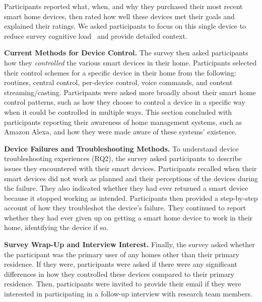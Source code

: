 Participants reported what, when, and why they purchased their most recent smart home devices, then rated how well these devices met their goals and explained their ratings. We asked participants to focus on this single device to reduce survey cognitive load~\cite{lenzner2010cognitive} and provide detailed context. 

\noindent\textbf{Current Methods for Device Control.}
\label{cic:survey:control}
The survey then asked participants how they \textit{controlled} the various smart devices in their home. Participants selected their control schemes for a specific device in their home from the following: routines, central control, per-device control, voice commands, and content streaming/casting. Participants were asked more broadly about their smart home control patterns, such as how they choose to control a device in a specific way when it could be controlled in multiple ways. This section concluded with participants reporting their awareness of home management systems, such as Amazon Alexa, and how they were made aware of these systems' existence. 

\noindent\textbf{Device Failures and Troubleshooting Methods.}
To understand device troubleshooting experiences (RQ2), the survey asked participants to describe issues they encountered with their smart devices. Participants recalled when their smart devices did not work as planned and their perceptions of the devices during the failure. They also indicated whether they had ever returned a smart device because it stopped working as intended. Participants then provided a step-by-step account of how they troubleshot the device's failure. They continued to report whether they had ever given up on getting a smart home device to work in their home, identifying the device if so.

\noindent\textbf{Survey Wrap-Up and Interview Interest.}
Finally, the survey asked whether the participant was the primary user of any homes other than their primary residence. If they were, participants were asked if there were any significant differences in how they controlled these devices compared to their primary residence. Then, participants were invited to provide their email if they were interested in participating in a follow-up interview with research team members. 

